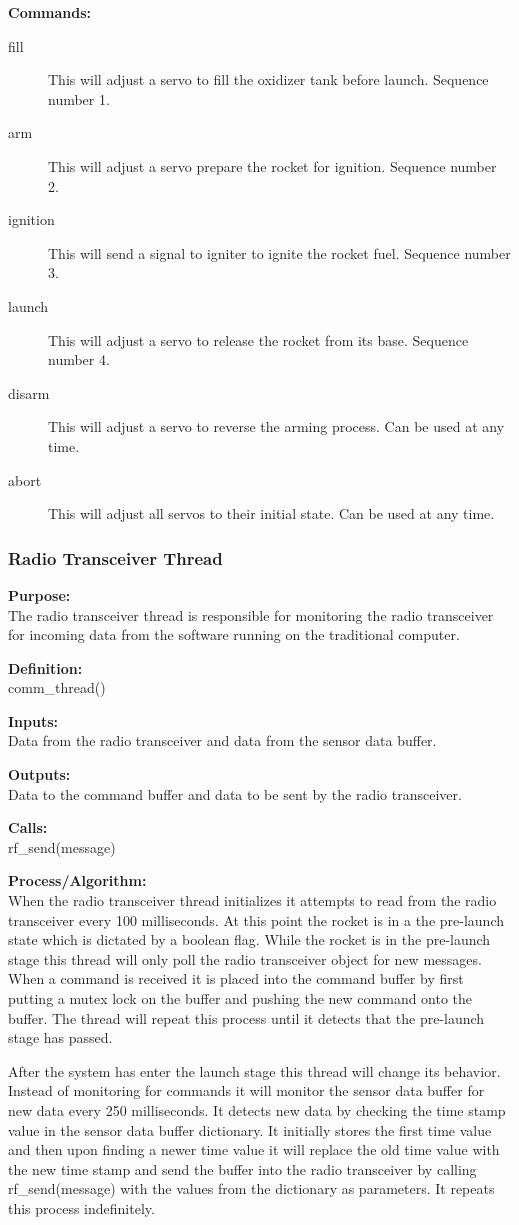 \documentclass[10pt,draftclsnofoot,onecolumn,retainorgcmds]{IEEEtran}
\begin{document}
{\bf Commands:} \\
\begin{description}
	\item[fill] This will adjust a servo to fill the oxidizer tank before launch. Sequence number 1.
	\item[arm] This will adjust a servo prepare the rocket for ignition. Sequence number 2.
	\item[ignition] This will send a signal to igniter to ignite the rocket fuel. Sequence number 3.
	\item[launch] This will adjust a servo to release the rocket from its base. Sequence number 4.
	\item[disarm] This will adjust a servo to reverse the arming process. Can be used at any time.
	\item[abort] This will adjust all servos to their initial state. Can be used at any time.
\end{description}
\subsubsection{Radio Transceiver Thread}
{\bf Purpose:} \\
The radio transceiver thread is responsible for monitoring the radio transceiver for incoming data from the software running on the traditional computer. \par
{\bf Definition:} \\ 
comm\_thread() \par
{\bf Inputs:} \\  Data from the radio transceiver and data from the sensor data buffer. \par
{\bf Outputs:} \\ Data to the command buffer and data to be sent by the radio transceiver. \par
{\bf Calls:} \\ rf\_send(message) \par
{\bf Process/Algorithm:} \\
When the radio transceiver thread initializes it attempts to read from the radio transceiver every 100 milliseconds. At this point the rocket is in a the pre-launch state which is dictated by a boolean flag. While the rocket is in the pre-launch stage this thread will only poll the radio transceiver object for new messages. When a command is received it is placed into the command buffer by first putting a mutex lock on the buffer and pushing the new command onto the buffer. The thread will repeat this process until it detects that the pre-launch stage has passed.  \par
After the system has enter the launch stage this thread will change its behavior. Instead of monitoring for commands it will monitor the sensor data buffer for new data every 250 milliseconds. It detects new data by checking the time stamp value in the sensor data buffer dictionary. It initially stores the first time value and then upon finding a newer time value it will replace the old time value with the new time stamp and send the buffer into the radio transceiver by calling rf\_send(message) with the values from the dictionary as parameters. It repeats this process indefinitely. \par
\end{document}
